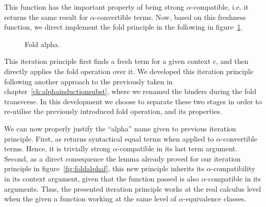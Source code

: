 \documentclass{book}
\newcommand\Wider[2][3em]{%
\makebox[\linewidth][c]{%
  \begin{minipage}{\dimexpr\textwidth+#1\relax}
  \raggedright#2
  \end{minipage}%
  }%
}
\newcommand{\alp}{\ensuremath{\alpha}}
\begin{document}
{


This function has the important property of being strong \alp-compatible, i.e. it returns the same result for \alp-convertible terms. Now, based on this freshness function, we direct implement the fold principle in the following in figure~\ref{fig:foldalpha}. 
  
\begin{figure}[h]
  \caption{Fold alpha.}
\label{fig:foldalpha}
\end{figure}

This iteration principle first finds a fresh term for a given context $c$, and then directly applies the fold operation over it. We developed this iteration principle following another approach to the previously taken in chapter~\ref{ch:alphainductionsubst}, where we renamed the binders during the fold transverse. In this development we choose to separate these two stages in order to re-utilise the previously introduced fold operation, and its properties.

We can now properly justify the ``alpha'' name given to previous iteration principle. First, as  returns syntactical equal terms when applied to \alp-convertible terms. Hence, it is trivially strong \alp-compatible in its last term argument. Second, as a direct consequence the lemma already proved for our iteration principle  in figure~\ref{fig:foldalphaf}, this new principle inherits its \alp-compatibility in its context argument, given that the function passed is also \alp-compatible in its arguments. Thus, the presented iteration principle works at the real calculus level when the given a function working at the same level of \alp-equivalence classes.
  


    
    


}
\end{document}

